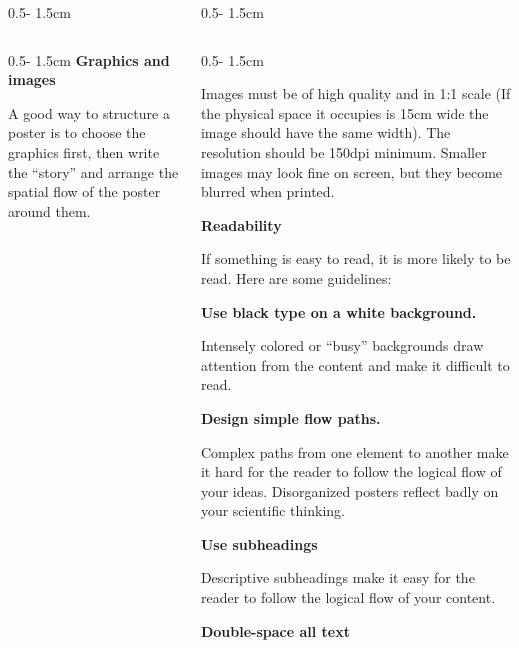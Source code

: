 \documentclass{uibposter}
\begin{document}
\begin{frame}
\begin{columns}
\begin{column}{0.5\textwidth - 1.5cm}
\begin{column}{0.5\textwidth - 1.5cm}
        \textbf{Graphics and images}
\vspace{0.5cm}

        A good way to structure a poster is to choose the graphics first, then write the “story” and arrange the spatial flow of the poster around them.
    \end{column}
\end{column}

\begin{column}{0.5\textwidth - 1.5cm}
\begin{column}{0.5\textwidth - 1.5cm}
\vspace*{-25.5cm}

    Images must be of high quality and in 1:1 scale (If the physical space it occupies is 15cm wide the image should have the same width). The  resolution should be 150dpi minimum. Smaller images may look fine on screen, but they become blurred when printed.


    \vspace{1.cm}

    \textbf{Readability}
\vspace{0.5cm}

    If something is easy to read, it is more likely to be read. Here are some guidelines:

\vspace{0.5cm}

    \textbf{Use black type on a white background.}
    \vspace{0.2cm}

    Intensely colored or “busy” backgrounds draw attention from the content and make it difficult to read.
\vspace{0.5cm}

    \textbf{Design simple flow paths.}
    \vspace{0.2cm}

    Complex paths from one element to another make it hard for the reader to follow the logical flow of your ideas. Disorganized posters reflect badly on your scientific thinking.
\vspace{0.5cm}

    \textbf{Use subheadings}
    \vspace{0.2cm}

    Descriptive subheadings make it easy for the reader to follow the logical flow of your content.
\vspace{0.5cm}

    \textbf{Double-space all text}
    \vspace{0.2cm}


\end{column}
\end{column}
\end{columns}
\end{frame}
\end{document}
